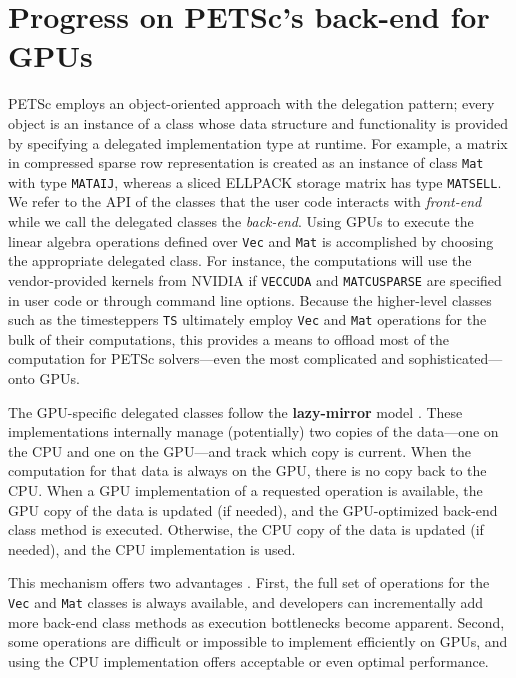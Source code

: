 \documentclass[5p,times]{elsarticle}
\begin{document}
\section{Progress on PETSc's back-end for GPUs}


PETSc employs an object-oriented approach with the delegation pattern; every
object is an instance of a class whose data structure and functionality is
provided by specifying a delegated implementation type at runtime. For example,
a matrix in compressed sparse row representation is created as an instance
of class {\tt Mat} with type {\tt MATAIJ}, whereas a sliced ELLPACK storage
matrix has type {\tt MATSELL}.
We refer
to the API of the classes that the user code interacts with {\it front-end} while we call the delegated
classes the {\it back-end}.
Using GPUs to execute the linear algebra operations defined over {\tt Vec} and
{\tt Mat} is accomplished by choosing the appropriate delegated class. For
instance,  the computations will use the vendor-provided kernels
from NVIDIA if {\tt VECCUDA} and {\tt MATCUSPARSE} are
specified in user code or through command line
options. 
Because the higher-level classes such as the timesteppers {\tt TS} ultimately employ {\tt Vec}
and {\tt Mat} operations for the bulk of their computations, this provides a
means to offload most of the computation for PETSc solvers---even the most
complicated and sophisticated---onto GPUs.

The GPU-specific delegated classes follow the {\bf lazy-mirror} model
\cite{petsc-msk2013}. These implementations internally manage (potentially) two
copies of the data---one on the CPU and one on the GPU---and track which copy is current. When the computation for that data is always on the GPU, there is no
copy back to the CPU. When a GPU implementation of a requested operation
is available, the GPU copy of the data is updated (if needed), and the
GPU-optimized back-end class method is executed. Otherwise, the CPU copy of the data is updated (if
needed), and the CPU implementation is used.

This mechanism offers two advantages \cite{Karl2020preparing}.  First, the full set of
operations for the {\tt Vec} and {\tt Mat} classes is always available, and
developers can incrementally add more back-end class methods as execution
bottlenecks become apparent. Second, some operations are difficult or impossible
to implement efficiently on GPUs, and using the CPU implementation offers
acceptable or even optimal performance.
\end{document}
